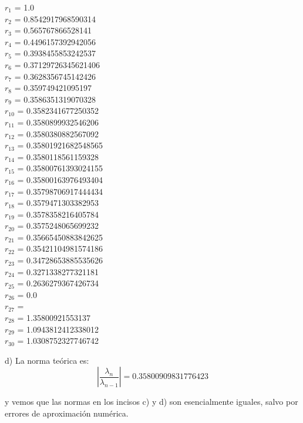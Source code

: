 \documentclass[11pt]{article}
\begin{document}
\begin{multicols}{3}
\noindent
$ r_{1} $ = 1.0 \\
$ r_{2} $ = 0.8542917968590314 \\
$ r_{3} $ = 0.565767866528141 \\
$ r_{4} $ = 0.4496157392942056 \\
$ r_{5} $ = 0.3938455853242537 \\
$ r_{6} $ = 0.37129726345621406 \\
$ r_{7} $ = 0.3628356745142426 \\
$ r_{8} $ = 0.359749421095197 \\
$ r_{9} $ = 0.3586351319070328 \\
$ r_{10} $ = 0.3582341677250352 \\
$ r_{11} $ = 0.3580899932546206 \\
$ r_{12} $ = 0.3580380882567092 \\
$ r_{13} $ = 0.35801921682548565 \\
$ r_{14} $ = 0.3580118561159328 \\
$ r_{15} $ = 0.35800761393024155 \\
$ r_{16} $ = 0.35800163976493404 \\
$ r_{17} $ = 0.35798706917444434 \\
$ r_{18} $ = 0.3579471303382953 \\
$ r_{19} $ = 0.3578358216405784 \\
$ r_{20} $ = 0.3575248065699232 \\
$ r_{21} $ = 0.35665450883842625 \\
$ r_{22} $ = 0.35421104981574186 \\
$ r_{23} $ = 0.34728653885535626 \\
$ r_{24} $ = 0.3271338277321181 \\
$ r_{25} $ = 0.2636279367426734  \\
$ r_{26} $ = 0.0 \\
$ r_{27} $ =  \\
$ r_{28} $ = 1.35800921553137  \\
$ r_{29} $ = 1.0943812412338012 \\
$ r_{30} $ = 1.0308752327746742 \\
\end{multicols}



d) La norma teórica es:
$$
\left| \frac{\lambda_n}{\lambda_{n-1}} \right| = 0.35800909831776423
$$

y vemos que las normas en los incisos c) y d) son esencialmente iguales, salvo por errores de aproximación numérica.
\\
\\
\end{document}
